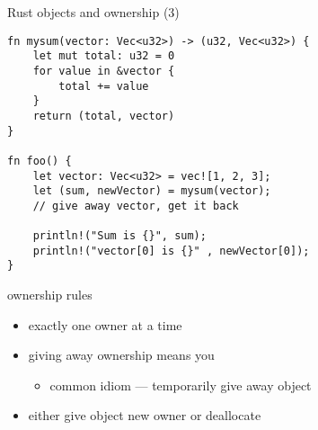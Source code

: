 \begin{frame}[fragile,label=rustOwnership3]{Rust objects and ownership (3)}
    \begin{verbatim}
fn mysum(vector: Vec<u32>) -> (u32, Vec<u32>) {
    let mut total: u32 = 0
    for value in &vector {
        total += value
    }
    return (total, vector)
}

fn foo() {
    let vector: Vec<u32> = vec![1, 2, 3];
    let (sum, newVector) = mysum(vector);
    // give away vector, get it back
    
    println!("Sum is {}", sum);
    println!("vector[0] is {}" , newVector[0]);
}
\end{verbatim}
\end{frame}

\begin{frame}{ownership rules}
    \begin{itemize}
    \item exactly one owner at a time
    \item giving away ownership means you 
        \begin{itemize}
        \item<2> common idiom --- temporarily give away object
        \end{itemize}
    \item either give object new owner or deallocate
    \end{itemize}
\end{frame}

